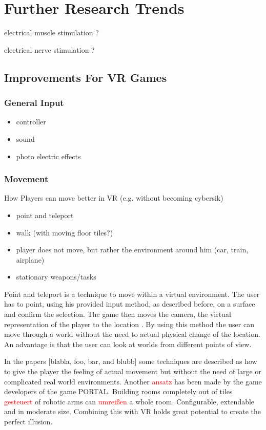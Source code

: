 \section{Further Research Trends}

electrical muscle stimulation ?

electrical nerve stimulation ?

\subsection{Improvements For VR Games}
\subsubsection{General Input}

\begin{itemize}
	\item controller
	\item sound
	\item photo electric effects
\end{itemize}

\subsubsection{Movement}
How Players can move better in VR (e.g. without becoming cybersik)

\begin{itemize}
	\item point and teleport
	\item walk (with moving floor tiles?)
	\item player does not move, but rather the environment around him (car, train, airplane)
	\item stationary weapons/tasks
\end{itemize}

Point and teleport is a technique to move within a virtual environment. The user has to point, using his provided input method, as described before, on a surface and confirm the selection. The game then moves the camera, the virtual representation of the player to the location . By using this method the user can move through a world without the need to actual physical change of the location. An advantage is that the user can look at worlds from different points of view. 

In the papers [blabla, foo, bar, and blubb] some techniques are described as how to give the player the feeling of actual movement but without the need of large or complicated real world environments. 
Another \textcolor{red}{ansatz} has been made by the game developers of the game PORTAL. Building rooms completely out of tiles \textcolor{red}{gesteuert} of robotic arms can \textcolor{red}{umreißen} a whole room. Configurable, extendable and in moderate size. Combining this with VR holds great potential to create the perfect illusion.

